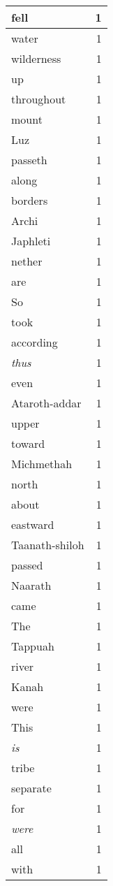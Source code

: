 \begin{center}
\begin{longtable}{l|r}
fell & 1 \\ \hline
water & 1 \\ \hline
wilderness & 1 \\ \hline
up & 1 \\ \hline
throughout & 1 \\ \hline
mount & 1 \\ \hline
Luz & 1 \\ \hline
passeth & 1 \\ \hline
along & 1 \\ \hline
borders & 1 \\ \hline
Archi & 1 \\ \hline
Japhleti & 1 \\ \hline
nether & 1 \\ \hline
are & 1 \\ \hline
So & 1 \\ \hline
took & 1 \\ \hline
according & 1 \\ \hline
\emph{thus} & 1 \\ \hline
even & 1 \\ \hline
Ataroth-addar & 1 \\ \hline
upper & 1 \\ \hline
toward & 1 \\ \hline
Michmethah & 1 \\ \hline
north & 1 \\ \hline
about & 1 \\ \hline
eastward & 1 \\ \hline
Taanath-shiloh & 1 \\ \hline
passed & 1 \\ \hline
Naarath & 1 \\ \hline
came & 1 \\ \hline
The & 1 \\ \hline
Tappuah & 1 \\ \hline
river & 1 \\ \hline
Kanah & 1 \\ \hline
were & 1 \\ \hline
This & 1 \\ \hline
\emph{is} & 1 \\ \hline
tribe & 1 \\ \hline
separate & 1 \\ \hline
for & 1 \\ \hline
\emph{were} & 1 \\ \hline
all & 1 \\ \hline
with & 1 \\ \hline

\end{longtable}
\end{center}
